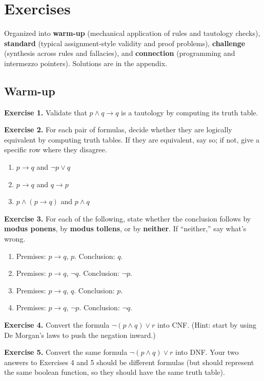 \documentclass[11pt]{article}
\begin{document}
\section{Exercises}

Organized into \textbf{warm-up} (mechanical application of rules and tautology checks), \textbf{standard} (typical assignment-style validity and proof problems), \textbf{challenge} (synthesis across rules and fallacies), and \textbf{connection} (programming and intermezzo pointers). Solutions are in the appendix.

\subsection*{Warm-up}

\textbf{Exercise 1.}\label{ex:m3:1} Validate that $p \wedge q \to q$ is a tautology by computing its truth table.

\bigskip
\textbf{Exercise 2.}\label{ex:m3:2} For each pair of formulas, decide whether they are logically equivalent by computing truth tables. If they are equivalent, say so; if not, give a specific row where they disagree.
\begin{enumerate}[label=(\alph*)]
  \item $p \to q$ and $\lnot p \vee q$
  \item $p \to q$ and $q \to p$
  \item $p \wedge (p \to q)$ and $p \wedge q$
\end{enumerate}

\bigskip
\textbf{Exercise 3.}\label{ex:m3:3} For each of the following, state whether the conclusion follows by \textbf{modus ponens}, by \textbf{modus tollens}, or by \textbf{neither}. If ``neither,'' say what's wrong.
\begin{enumerate}[label=(\alph*)]
  \item Premises: $p \to q$, $p$. Conclusion: $q$.
  \item Premises: $p \to q$, $\lnot q$. Conclusion: $\lnot p$.
  \item Premises: $p \to q$, $q$. Conclusion: $p$.
  \item Premises: $p \to q$, $\lnot p$. Conclusion: $\lnot q$.
\end{enumerate}

\bigskip
\textbf{Exercise 4.}\label{ex:m3:4} Convert the formula $\lnot(p \wedge q) \vee r$ into CNF. (Hint: start by using De Morgan's laws to push the negation inward.)

\bigskip
\textbf{Exercise 5.}\label{ex:m3:5} Convert the same formula $\lnot(p \wedge q) \vee r$ into DNF. Your two answers to Exercises 4 and 5 should be different formulas (but should represent the same boolean function, so they should have the same truth table).
\end{document}
